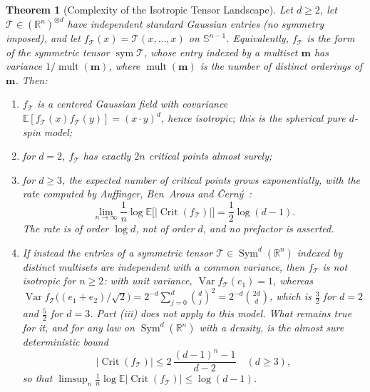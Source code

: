 \documentclass[11pt,a4paper,reqno]{amsart}
\newtheorem{theorem}{Theorem}[section]
\theoremstyle{definition}
\numberwithin{equation}{section}
\newcommand{\R}{\mathbb{R}}
\newcommand{\Sph}{\mathbb{S}}
\begin{document}
\begin{theorem}[Complexity of the Isotropic Tensor Landscape]
\label{thm:kac_rice_tensors}
Let $d \ge 2$, let $\mathcal{T} \in (\R^n)^{\otimes d}$ have independent standard Gaussian entries (no symmetry imposed), and let $f_{\mathcal{T}}(x) = \mathcal{T}(x, \dots, x)$ on $\Sph^{n-1}$. Equivalently, $f_{\mathcal{T}}$ is the form of the symmetric tensor $\operatorname{sym}\mathcal{T}$, whose entry indexed by a multiset $\mathbf{m}$ has variance $1/\operatorname{mult}(\mathbf{m})$, where $\operatorname{mult}(\mathbf{m})$ is the number of distinct orderings of $\mathbf{m}$. Then:
\begin{enumerate}[label=(\roman*)]
    \item $f_{\mathcal{T}}$ is a centered Gaussian field with covariance $\mathbb{E}[f_{\mathcal{T}}(x) f_{\mathcal{T}}(y)] = (x \cdot y)^d$, hence isotropic; this is the spherical pure $d$-spin model;
    \item for $d = 2$, $f_{\mathcal{T}}$ has exactly $2n$ critical points almost surely;
    \item for $d \ge 3$, the expected number of critical points grows exponentially, with the rate computed by Auffinger, Ben~Arous and \v{C}ern\'y~\cite[Remark~2.9, Eq.~(2.20)]{auffinger2013random}:
    \begin{equation}
        \label{eq:abc_complexity}
        \lim_{n \to \infty} \frac{1}{n} \log \mathbb{E}\big[|\operatorname{Crit}(f_{\mathcal{T}})|\big] = \frac{1}{2} \log(d-1).
    \end{equation}
    The rate is of order $\log d$, not of order $d$, and no prefactor is asserted.
    \item If instead the entries of a symmetric tensor $\mathcal{T} \in \operatorname{Sym}^d(\R^n)$ indexed by distinct multisets are independent with a common variance, then $f_{\mathcal{T}}$ is not isotropic for $n \ge 2$: with unit variance, $\operatorname{Var} f_{\mathcal{T}}(e_1) = 1$, whereas $\operatorname{Var} f_{\mathcal{T}}\big((e_1+e_2)/\sqrt{2}\big) = 2^{-d}\sum_{j=0}^d \binom{d}{j}^2 = 2^{-d}\binom{2d}{d}$, which is $\tfrac32$ for $d=2$ and $\tfrac52$ for $d=3$. Part (iii) does not apply to this model. What remains true for it, and for any law on $\operatorname{Sym}^d(\R^n)$ with a density, is the almost sure deterministic bound
    \begin{equation}
        \label{eq:cs_bound}
        |\operatorname{Crit}(f_{\mathcal{T}})| \le 2\, \frac{(d-1)^n - 1}{d-2} \quad (d \ge 3),
    \end{equation}
    so that $\limsup_n \frac1n \log \mathbb{E}|\operatorname{Crit}(f_{\mathcal{T}})| \le \log(d-1)$.
\end{enumerate}
\end{theorem}
\end{document}
